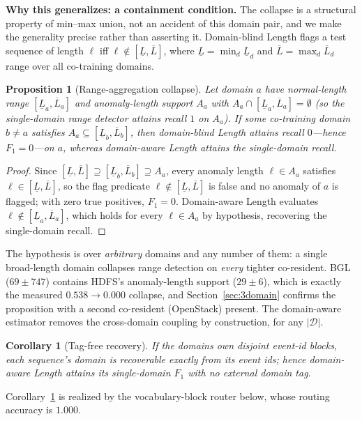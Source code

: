 \documentclass[journal]{IEEEtran}
\newtheorem{proposition}{Proposition}
\newtheorem{corollary}{Corollary}
\begin{document}
\textbf{Why this generalizes: a containment condition.} The collapse is a structural property of
min--max union, not an accident of this domain pair, and we make the generality precise rather than
asserting it. Domain-blind Length flags a test sequence of length $\ell$ iff
$\ell\notin[\underline{L},\overline{L}]$, where $\underline{L}=\min_{d}\underline{L}_d$ and
$\overline{L}=\max_{d}\overline{L}_d$ range over all co-training domains.

\begin{proposition}[Range-aggregation collapse]\label{prop:collapse}
Let domain $a$ have normal-length range $[\underline{L}_a,\overline{L}_a]$ and anomaly-length support
$A_a$ with $A_a\cap[\underline{L}_a,\overline{L}_a]=\emptyset$ (so the single-domain range detector
attains recall $1$ on $A_a$). If some co-training domain $b\neq a$ satisfies
$A_a\subseteq[\underline{L}_b,\overline{L}_b]$, then domain-blind Length attains recall $0$---hence
$F_1=0$---on $a$, whereas domain-aware Length attains the single-domain recall.
\end{proposition}
\begin{proof}
Since $[\underline{L},\overline{L}]\supseteq[\underline{L}_b,\overline{L}_b]\supseteq A_a$, every
anomaly length $\ell\in A_a$ satisfies $\ell\in[\underline{L},\overline{L}]$, so the flag predicate
$\ell\notin[\underline{L},\overline{L}]$ is false and no anomaly of $a$ is flagged; with zero true
positives, $F_1=0$. Domain-aware Length evaluates $\ell\notin[\underline{L}_a,\overline{L}_a]$, which
holds for every $\ell\in A_a$ by hypothesis, recovering the single-domain recall.
\end{proof}

The hypothesis is over \emph{arbitrary} domains and any number of them: a single broad-length domain
collapses range detection on \emph{every} tighter co-resident. BGL ($69\pm747$) contains HDFS's
anomaly-length support ($29\pm6$), which is exactly the measured $0.538\!\rightarrow\!0.000$ collapse,
and Section~\ref{sec:3domain} confirms the proposition with a second co-resident (OpenStack) present.
The domain-aware estimator removes the cross-domain coupling by construction, for any $|\mathcal{D}|$.

\begin{corollary}[Tag-free recovery]\label{cor:routing}
If the domains own disjoint event-id blocks, each sequence's domain is recoverable exactly from its
event ids; hence domain-aware Length attains its single-domain $F_1$ with no external domain tag.
\end{corollary}
\noindent Corollary~\ref{cor:routing} is realized by the vocabulary-block router below, whose routing
accuracy is $1.000$.
\end{document}
